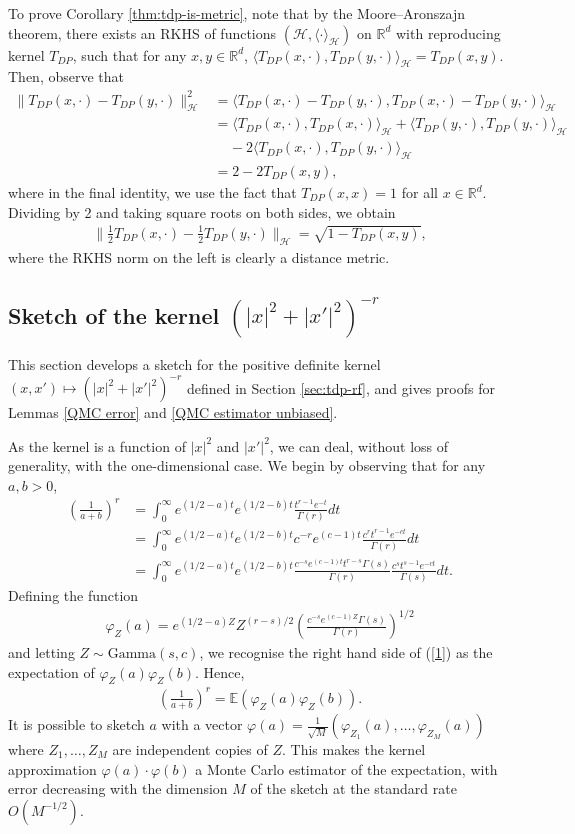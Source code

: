 \documentclass{article}
\theoremstyle{plain}
\theoremstyle{definition}
\theoremstyle{remark}
\newcommand{\numeq}[1]{\begin{align}#1\end{align}}
\newcommand{\eq}[1]{\begin{align*}#1\end{align*}}
\newcommand{\E}{\mathbb{E}}
\newcommand{\R}{\mathbb{R}}
\begin{document}
To prove Corollary \ref{thm:tdp-is-metric}, note that by the Moore--Aronszajn theorem, there exists an RKHS of functions $(\mathcal H, \langle\cdot\rangle_\mathcal{H})$ on $\R^d$ with reproducing kernel $T_{DP}$, such that for any $x,y\in\R^d$, $\langle T_{DP}(x,\cdot), T_{DP}(y,\cdot) \rangle_\mathcal{H} = T_{DP}(x,y)$. Then, observe that 
\eq{
\|T_{DP}(x,\cdot)-T_{DP}(y,\cdot)\|_\mathcal{H}^2
&= \langle T_{DP}(x,\cdot)- T_{DP}(y,\cdot),T_{DP}(x,\cdot)- T_{DP}(y,\cdot) \rangle_\mathcal{H} \\
&= \langle T_{DP}(x,\cdot),T_{DP}(x,\cdot) \rangle_\mathcal{H} 
+ \langle T_{DP}(y,\cdot), T_{DP}(y,\cdot) \rangle_\mathcal{H} \\
& ~~~~~- 2 \langle T_{DP}(x,\cdot), T_{DP}(y,\cdot) \rangle_\mathcal{H} \\
& = 2 - 2T_{DP}(x,y),
}
where in the final identity, we use the fact that $T_{DP}(x,x)=1$ for all $x\in\R^d$. Dividing by 2 and taking square roots on both sides, we obtain
\eq{
\Big\|\frac{1}{2}T_{DP}(x,\cdot)-\frac{1}{2}T_{DP}(y,\cdot)\Big\|_\mathcal{H} = \sqrt{1-T_{DP}(x,y)},
}
where the RKHS norm on the left is clearly a distance metric. 

\subsection{Sketch of the kernel $(|x|^2 + |x'|^2)^{-r}$}
\label{apdx:prefactor-sketch}

This section develops a sketch for the positive definite kernel $(x,x')\mapsto (|x|^2 + |x'|^2)^{-r}$ defined in Section \ref{sec:tdp-rf}, and gives proofs for Lemmas \ref{QMC error} and \ref{QMC estimator unbiased}.

As the kernel is a function of $|x|^2$ and $|x'|^2$, we can deal, without loss of generality, with the one-dimensional case. We begin by observing that for any $a,b>0$,
\numeq{
\left(\frac{1}{a+b}\right)^r 
&= \int_0^\infty e^{(1/2-a)t}e^{(1/2-b)t} \frac{t^{r-1} e^{-t}}{\Gamma(r)}dt \nonumber \\
&= \int_0^\infty e^{(1/2-a)t}e^{(1/2-b)t}c^{-r}e^{(c-1)t} \frac{c^r t^{r-1} e^{-ct}}{\Gamma(r)}dt \nonumber \\
&= \int_0^\infty e^{(1/2-a)t}e^{(1/2-b)t}\frac{c^{-s}e^{(c-1)t}t^{r-s}\Gamma(s)}{\Gamma(r)} \frac{c^s t^{s-1} e^{-ct}}{\Gamma(s)}dt. \label{1}
}
Defining the function
\eq{
\varphi_Z(a) = e^{(1/2-a)Z} Z^{(r-s)/2}\left(\frac{c^{-s}e^{(c-1)Z}\Gamma(s)}{\Gamma(r)} \right)^{1/2}
}
and letting $Z\sim\text{Gamma}(s,c)$, we recognise the right hand side of (\ref{1}) as the expectation of $\varphi_Z(a)\varphi_Z(b)$. Hence, 
\eq{
\left(\frac{1}{a+b}\right)^r = \E(\varphi_Z(a)\varphi_Z(b)).
}
It is possible to sketch $a$ with a vector $\varphi(a) = \frac{1}{\sqrt{M}}(\varphi_{Z_1}(a),\dots,\varphi_{Z_M}(a))$ where $Z_1,\dots,Z_M$ are independent copies of $Z$. This makes the kernel approximation $\varphi(a)\cdot \varphi(b)$ a Monte Carlo estimator of the expectation, with error decreasing with the dimension $M$ of the sketch at the standard rate $O(M^{-1/2})$. 
\end{document}
